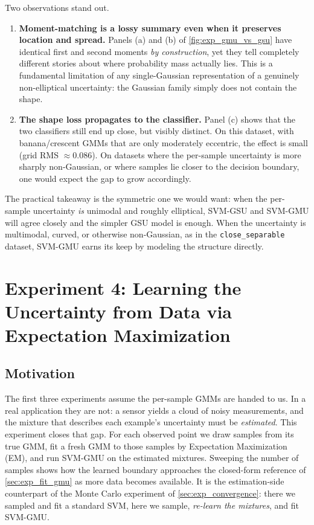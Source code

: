 \documentclass[11pt, letterpaper]{article}
\begin{document}
Two observations stand out.
\begin{enumerate}[leftmargin=2em]
    \item \textbf{Moment-matching is a lossy summary even when it preserves location and spread.} Panels (a) and (b) of \cref{fig:exp_gmu_vs_gsu} have identical first and second moments \emph{by construction}, yet they tell completely different stories about where probability mass actually lies. This is a fundamental limitation of any single-Gaussian representation of a genuinely non-elliptical uncertainty: the Gaussian family simply does not contain the shape.
    \item \textbf{The shape loss propagates to the classifier.} Panel (c) shows that the two classifiers still end up close, but visibly distinct. On this dataset, with banana/crescent GMMs that are only moderately eccentric, the effect is small (grid RMS $\approx 0.086$). On datasets where the per-sample uncertainty is more sharply non-Gaussian, or where samples lie closer to the decision boundary, one would expect the gap to grow accordingly.
\end{enumerate}
The practical takeaway is the symmetric one we would want: when the per-sample uncertainty \emph{is} unimodal and roughly elliptical, SVM-GSU and SVM-GMU will agree closely and the simpler GSU model is enough. When the uncertainty is multimodal, curved, or otherwise non-Gaussian, as in the \texttt{close\_separable} dataset, SVM-GMU earns its keep by modeling the structure directly.


\section{Experiment 4: Learning the Uncertainty from Data via Expectation Maximization}\label{sec:exp_em_fitted}

\subsection{Motivation}

The first three experiments assume the per-sample GMMs are handed to us. In a real application they are not: a sensor yields a cloud of noisy measurements, and the mixture that describes each example's uncertainty must be \emph{estimated}. This experiment closes that gap. For each observed point we draw samples from its true GMM, fit a fresh GMM to those samples by Expectation Maximization (EM), and run SVM-GMU on the estimated mixtures. Sweeping the number of samples shows how the learned boundary approaches the closed-form reference of \cref{sec:exp_fit_gmu} as more data becomes available. It is the estimation-side counterpart of the Monte Carlo experiment of \cref{sec:exp_convergence}: there we sampled and fit a standard SVM, here we sample, \emph{re-learn the mixtures}, and fit SVM-GMU.
\end{document}

